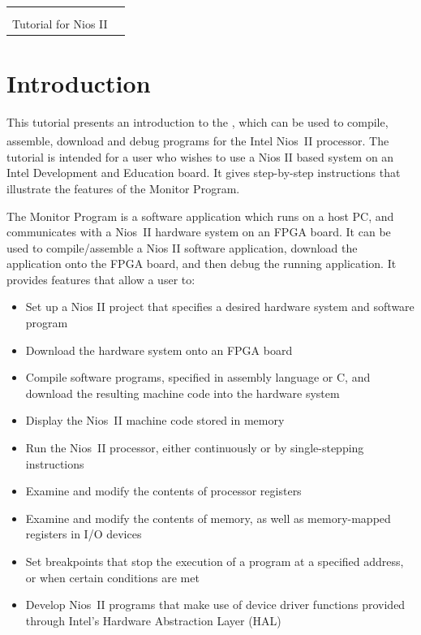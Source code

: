 \documentclass[11pt, twoside, pdftex]{article}
\title{\fontfamily{phv}\selectfont{\doctitle} }
\newcommand{\doctitle}{\productNameMed{} \\ Tutorial for Nios\textsuperscript{\textregistered} II}
\begin{document}
\begin{table}
    \centering
    \begin{tabular}{p{5cm}p{4cm}}
        \hspace{-3cm}
        &
        \raisebox{1\height}{\parbox[h]{0.5\textwidth}{\Large{}\selectfont{\textsf{\doctitle}}}}
    \end{tabular}
    \label{tab:logo}
\end{table}

\colorbox[rgb]{0,0.384,0.816}{\parbox[h]{\textwidth}{\color{white}\textsf{\textit{\textBar}}}}

\thispagestyle{plain}
 
\section{Introduction}

This tutorial presents an introduction to the \productNameMed{}, 
which can be used to compile, assemble, download and
debug programs for the Intel Nios\textsuperscript{\textregistered}~II processor. 
The tutorial is intended for a user who wishes to use a Nios II
based system on an Intel Development and Education board. It
gives step-by-step instructions that illustrate
the features of the Monitor Program.

The Monitor Program is a software application which runs on a
host PC, and communicates with a Nios~II hardware system on an
FPGA board. It can be used to compile/assemble a
Nios II software application, download the application onto the
FPGA board, and then debug the running application.   
It provides features that allow a user to:

\begin{itemize}
    \item Set up a Nios II project that specifies a desired
hardware system and software program
    \item Download the hardware system onto an FPGA board
    \item Compile software programs, specified in assembly language or C, and download the resulting machine code into the
hardware system
    \item Display the Nios~II machine code stored in memory
    \item Run the Nios~II processor, either continuously or by single-stepping instructions
    \item Examine and modify the contents of processor registers
    \item Examine and modify the contents of memory, as well as
memory-mapped registers in I/O devices
    \item Set breakpoints that stop the execution of a program at
a specified address, or when certain conditions are met
    \item Develop Nios~II programs that make use of device driver
functions provided through Intel's Hardware Abstraction Layer
(HAL)
\end{itemize}
\end{document}
